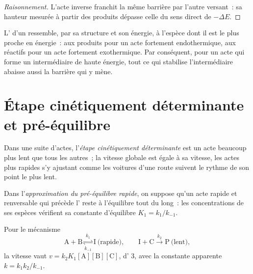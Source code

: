 \begin{proof}[Raisonnement]
L'acte inverse franchit la même barrière par l'autre versant~: sa
hauteur mesurée à partir des produits dépasse celle du sens direct de
$-\Delta E$.
\end{proof}

\begin{proposition}\label{prop:b1:elementary-steps:hammond}
L' d'un  ressemble, par sa structure
et son énergie, à l'espèce dont il est le plus proche en énergie~: aux
produits pour un acte fortement endothermique, aux réactifs pour un acte
fortement exothermique. Par conséquent, pour un acte qui forme un
intermédiaire de haute énergie, tout ce qui stabilise l'intermédiaire
abaisse aussi la barrière qui y mène.
\end{proposition}
\admitted

\section{Étape cinétiquement déterminante et pré-équilibre}

\begin{definition}\label{def:b1:elementary-steps:rds}
Dans une suite d'actes, l'\emph{étape cinétiquement
déterminante} est un acte beaucoup plus lent que tous les
autres~; la vitesse globale est égale à sa vitesse, les actes plus
rapides s'y ajustant comme les voitures d'une route suivent le rythme
de son point le plus lent.
\end{definition}

\begin{definition}\label{def:b1:elementary-steps:pre-equilibrium}
Dans l'\emph{approximation du pré-équilibre rapide},
on suppose qu'un acte rapide et renversable qui précède l' reste à l'équilibre tout du long~: les
concentrations de ses espèces vérifient sa constante d'équilibre
$K_1 = k_1/k_{-1}$.
\end{definition}

\begin{proposition}\label{prop:b1:elementary-steps:pre-equilibrium-law}
Pour le mécanisme
\[
  \mathrm{A} + \mathrm{B} \underset{k_{-1}}{\overset{k_1}{\rightleftharpoons}} \mathrm{I}
  \ \text{(rapide)}, \qquad
  \mathrm{I} + \mathrm{C} \xrightarrow{\ k_2\ } \mathrm{P} \ \text{(lent)},
\]
la vitesse vaut $v = k_2K_1[\mathrm{A}][\mathrm{B}][\mathrm{C}]$, d' 3, avec la constante apparente $k = k_1k_2/k_{-1}$.
\end{proposition}

